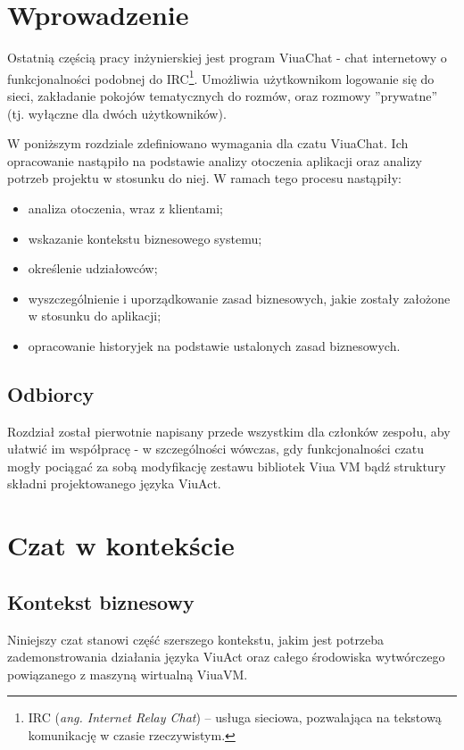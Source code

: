 \section{Wprowadzenie}

Ostatnią częścią pracy inżynierskiej jest program ViuaChat - chat internetowy o funkcjonalności podobnej do IRC\footnote{IRC (\textit{ang. Internet Relay Chat}) -- usługa sieciowa, pozwalająca na tekstową komunikację w czasie rzeczywistym.}.
Umożliwia użytkownikom logowanie się do sieci, zakładanie pokojów tematycznych do rozmów, oraz rozmowy
''prywatne'' (tj. wyłączne dla dwóch użytkowników).

W poniższym rozdziale zdefiniowano wymagania dla czatu ViuaChat. Ich opracowanie nastąpiło na podstawie analizy otoczenia aplikacji oraz analizy potrzeb projektu w stosunku do niej. W ramach tego procesu nastąpiły:
\begin{itemize}
    \item analiza otoczenia, wraz z klientami;
    \item wskazanie kontekstu biznesowego systemu;
    \item określenie udziałowców;
	\item wyszczególnienie i uporządkowanie zasad biznesowych, jakie zostały założone w stosunku do aplikacji;
	\item opracowanie historyjek na podstawie ustalonych zasad biznesowych.
\end{itemize}

\subsection{Odbiorcy}
Rozdział został pierwotnie napisany przede wszystkim dla członków zespołu, aby ułatwić im współpracę - w szczególności wówczas, gdy funkcjonalności czatu mogły pociągać za sobą modyfikację zestawu bibliotek Viua VM bądź struktury składni projektowanego języka ViuAct.

\section{Czat w kontekście}

\subsection{Kontekst biznesowy}

Niniejszy czat stanowi część szerszego kontekstu, jakim jest potrzeba zademonstrowania działania języka ViuAct oraz całego środowiska wytwórczego powiązanego z maszyną wirtualną ViuaVM.


